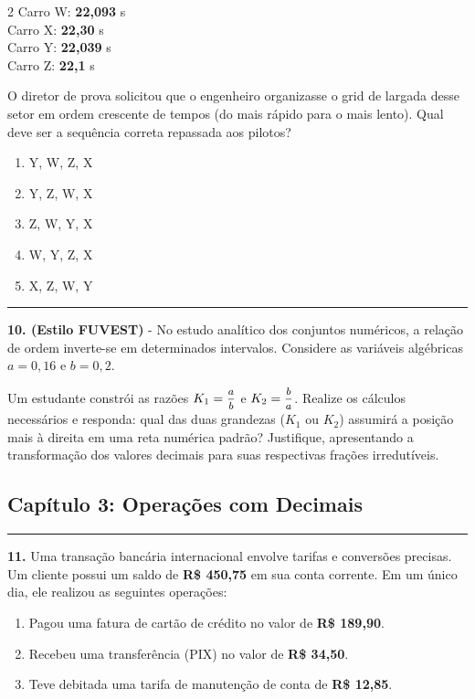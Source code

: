 \documentclass[twoside, 10pt, a4paper]{article}
\newlength{\espacoPosTitulo}
\newlength{\espacoPreQuestao}
\newlength{\espacoQuestao}
\begin{document}
\begin{multicols*}{2}
Carro W: \textbf{22,093} s\\
Carro X: \textbf{22,30} s\\
Carro Y: \textbf{22,039} s\\
Carro Z: \textbf{22,1} s

O diretor de prova solicitou que o engenheiro organizasse o grid de largada desse setor em ordem crescente de tempos (do mais rápido para o mais lento). Qual deve ser a sequência correta repassada aos pilotos?
\begin{enumerate}[label=\alph*)]
    \item Y, W, Z, X
    \item Y, Z, W, X
    \item Z, W, Y, X
    \item W, Y, Z, X
    \item X, Z, W, Y
\end{enumerate}
\par\vspace{\espacoQuestao}

\noindent\textcolor{CorLinha}{\rule{\linewidth}{0.5pt}} 
\par\vspace{\espacoPreQuestao}
\textbf{10. (Estilo FUVEST)} - No estudo analítico dos conjuntos numéricos, a relação de ordem inverte-se em determinados intervalos. Considere as variáveis algébricas $ a = 0,16 $ e $ b = 0,2 $.

Um estudante constrói as razões $ K_1 = \mfrac{a}{b} $ e $ K_2 = \mfrac{b}{a} $. Realize os cálculos necessários e responda: qual das duas grandezas ($ K_1 $ ou $ K_2 $) assumirá a posição mais à direita em uma reta numérica padrão? Justifique, apresentando a transformação dos valores decimais para suas respectivas frações irredutíveis.
\par\vspace{\espacoQuestao}

\subsection*{Capítulo 3: Operações com Decimais}
\vspace{-0.2cm}\noindent\rule{\linewidth}{1.5pt} 
\par\vspace{\espacoPosTitulo}
\textbf{11.} Uma transação bancária internacional envolve tarifas e conversões precisas. Um cliente possui um saldo de \textbf{R\$ 450,75} em sua conta corrente. Em um único dia, ele realizou as seguintes operações:
\begin{enumerate}[label=\arabic*.]
    \item Pagou uma fatura de cartão de crédito no valor de \textbf{R\$ 189,90}.
    \item Recebeu uma transferência (PIX) no valor de \textbf{R\$ 34,50}.
    \item Teve debitada uma tarifa de manutenção de conta de \textbf{R\$ 12,85}.
\end{enumerate}


\end{multicols*}
\end{document}
